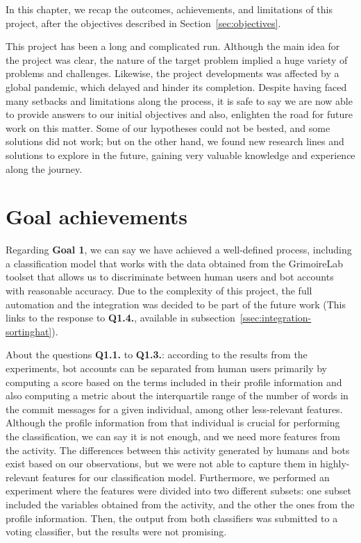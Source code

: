 \documentclass[a4paper, 12pt]{book}
\begin{document}
In this chapter, we recap the outcomes, achievements, and limitations of this project, after the objectives described in Section~\ref{sec:objectives}.

This project has been a long and complicated run. Although the main idea for the project was clear, the nature of the target problem implied a huge variety of problems and challenges. Likewise, the project developments was affected by a global pandemic, which delayed and hinder its completion. Despite having faced many setbacks and limitations along the process, it is safe to say we are now able to provide answers to our initial objectives and also, enlighten the road for future work on this matter. Some of our hypotheses could not be bested, and some solutions did not work; but on the other hand, we found new research lines and solutions to explore in the future, gaining very valuable knowledge and experience along the journey.

\section{Goal achievements}
\label{sec:goal-achievements}

Regarding \textbf{Goal 1}, we can say we have achieved a well-defined process, including a classification model that works with the data obtained from the GrimoireLab toolset that allows us to discriminate between human users and bot accounts with reasonable accuracy. Due to the complexity of this project, the full automation and the integration was decided to be part of the future work (This links to the response to \textbf{Q1.4.}, available in subsection~\ref{ssec:integration-sortinghat}).

About the questions \textbf{Q1.1. }to \textbf{Q1.3.}: according to the results from the experiments, bot accounts can be separated from human users primarily by computing a score based on the terms included in their profile information and also computing a metric about the interquartile range of the number of words in the commit messages for a given individual, among other less-relevant features. Although the profile information from that individual is crucial for performing the classification, we can say it is not enough, and we need more features from the activity. The differences between this activity generated by humans and bots exist based on our observations, but we were not able to capture them in highly-relevant features for our classification model. Furthermore, we performed an experiment where the features were divided into two different subsets: one subset included the variables obtained from the activity, and the other the ones from the profile information. Then, the output from both classifiers was submitted to a voting classifier, but the results were not promising.
\end{document}
